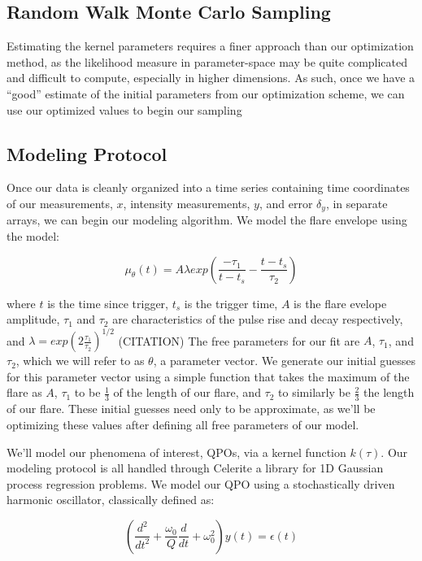 \documentclass{aastex61}
\begin{document}
\subsection{Random Walk Monte Carlo Sampling}
Estimating the kernel parameters requires a finer approach than our optimization method, as the likelihood measure in parameter-space may be quite complicated and difficult to compute, especially in higher dimensions.
As such, once we have a ``good'' estimate of the initial parameters from our optimization scheme, we can use our optimized values to begin our sampling

\subsection{Modeling Protocol}
Once our data is cleanly organized into a time series containing time coordinates of our measurements, $x$, intensity measurements, $y$, and error $\delta_y$, in separate arrays, we can begin our modeling algorithm. We model the flare envelope using the model:

\begin{equation}
	\mu_{\theta}(t) = A \lambda exp{\left( \frac{-\tau_1}{t-t_s}-\frac{t-t_s}{\tau_2}\right)}
	\label{model}
\end{equation}

where $t$ is the time since trigger, $t_s$ is the trigger time, $A$ is the flare evelope amplitude, $\tau_1$ and $\tau_2$ are characteristics of the pulse rise and decay respectively, and 
$\lambda = exp(2\frac{\tau_1}{\tau_2})^{1/2}$ (CITATION)
The free parameters for our fit are $A$, $\tau_1$, and $\tau_2$, which we will refer to as $\theta$, a parameter vector.
We generate our initial guesses for this parameter vector using a simple function that takes the maximum of the flare as $A$, $\tau_1$ to be $\frac{1}{3}$ of the length of our flare, and $\tau_2$ to similarly be $\frac{2}{3}$ the length of our flare.
These initial guesses need only to be approximate, as we'll be optimizing these values after defining all free parameters of our model.

We'll model our phenomena of interest, QPOs, via a kernel function $k(\tau)$.  Our modeling protocol is all handled through Celerite a library for 1D Gaussian process regression problems.
We model our QPO using a stochastically driven harmonic oscillator, classically defined as:

\begin{equation}
	\left( \frac{d^2}{dt^2} + \frac{\omega_0}{Q} \frac{d}{dt} + \omega_0^2 \right) y(t) = \epsilon(t) 
	\label{sho}
\end{equation}
\end{document}
